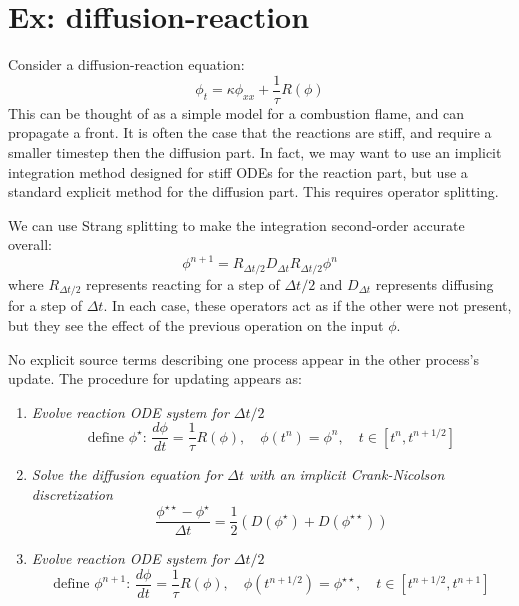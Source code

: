 \section{Ex: diffusion-reaction}
\label{sec:multiphys:diffreact}

Consider a diffusion-reaction equation:
\begin{equation}
\phi_t = \kappa \phi_{xx} + \frac{1}{\tau} R(\phi)
\end{equation}
This can be thought of as a simple model for a combustion flame, and
can propagate a front.  It is often the case that the reactions are
stiff, and require a smaller timestep then the diffusion part.  In
fact, we may want to use an implicit integration method designed for
stiff ODEs for the reaction part, but use a standard explicit method
for the diffusion part.  This requires operator splitting.

We can use Strang splitting \cite{strang} to make the integration
second-order accurate overall:
\begin{equation}
\phi^{n+1} = R_{\Delta t/2} D_{\Delta t} R_{\Delta t/2} \phi^n
\end{equation}
where $R_{\Delta t/2}$ represents reacting for a step of $\Delta t/2$
and $D_{\Delta t}$ represents diffusing for a step of $\Delta t$.  In
each case, these operators act as if the other were not present, but
they see the effect of the previous operation on the input $\phi$.  

No explicit source terms describing one process appear in the other
process's update.  The procedure for updating appears as:
\begin{enumerate}
\item {\em Evolve reaction ODE system for $\Delta t/2$}
   \begin{equation}
     \text{define } \phi^\star: \, \frac{d\phi}{dt} = \frac{1}{\tau} R(\phi), \quad 
   \phi(t^n) = \phi^n, \quad t \in [t^n, t^{n+1/2}]
   \end{equation}

\item {\em Solve the diffusion equation for $\Delta t$ with an
           implicit Crank-Nicolson discretization}
   \begin{equation}
     \frac{\phi^{\star\star} - \phi^\star}{\Delta t} =
      \frac{1}{2} (D(\phi^\star) + D(\phi^{\star\star}))
   \end{equation}

\item {\em Evolve reaction ODE system for $\Delta t/2$}
   \begin{equation}
     \text{define } \phi^{n+1}: \, \frac{d\phi}{dt} = \frac{1}{\tau} R(\phi), \quad 
   \phi(t^{n+1/2}) = \phi^{\star\star}, \quad t \in [t^{n+1/2}, t^{n+1}]
   \end{equation}

\end{enumerate}

